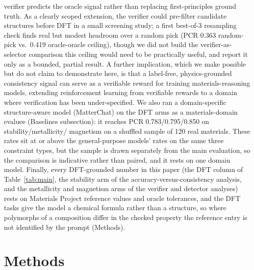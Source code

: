 \documentclass[pdflatex,sn-nature]{sn-jnl}
\newcommand{\rev}[1]{#1}
\newcommand{\rev}[1]{{\color{blue}#1}}
\begin{document}
verifier predicts the oracle signal rather than replacing first-principles ground
truth. As a clearly scoped extension, the verifier could pre-filter candidate
structures before DFT in a small screening study; a first best-of-3 resampling check finds
real but modest headroom over a random pick (PCR 0.363 random-pick vs.\ 0.419 oracle-oracle
ceiling), though we did not build the verifier-as-selector comparison this ceiling would
need to be practically useful, and report it only as a bounded, partial result. A further implication,
which we make possible but do not claim to demonstrate here, is that a label-free,
physics-grounded consistency signal can serve as a verifiable reward for training
materials-reasoning models, extending reinforcement learning from verifiable rewards
to a domain where verification has been under-specified.\cite{scirlvr2026} We also ran a
domain-specific structure-aware model (MatterChat) on the DFT arms as a materials-domain
evaluee (Baselines subsection): it reaches PCR 0.783/0.795/0.850 on stability/metallicity/
magnetism on a shuffled sample of 120 real materials. These rates sit at or above the
general-purpose models' rates on the same three constraint types, but the sample is drawn
separately from the main evaluation, so the comparison is indicative rather than paired,
and it rests on one domain model. Finally,
every DFT-grounded number in this paper (the DFT column of Table~\ref{tab:main}, the
stability arm of the accuracy-versus-consistency analysis, and the metallicity and
magnetism arms of the verifier and detector analyses) rests on Materials Project
reference values and oracle tolerances\rev{, and the DFT tasks give the model a chemical formula
rather than a structure, so where polymorphs of a composition differ in the checked property the
reference entry is not identified by the prompt (Methods).}

\section*{Methods}
\end{document}
